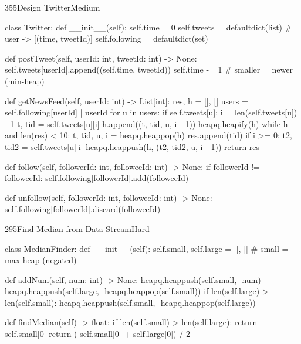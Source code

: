 \begin{problem}{355}{Design Twitter}{Medium}
\begin{code}
class Twitter:
    def __init__(self):
        self.time = 0
        self.tweets = defaultdict(list)    # user -> [(time, tweetId)]
        self.following = defaultdict(set)

    def postTweet(self, userId: int, tweetId: int) -> None:
        self.tweets[userId].append((self.time, tweetId))
        self.time -= 1                     # smaller = newer (min-heap)

    def getNewsFeed(self, userId: int) -> List[int]:
        res, h = [], []
        users = self.following[userId] | {userId}
        for u in users:
            if self.tweets[u]:
                i = len(self.tweets[u]) - 1
                t, tid = self.tweets[u][i]
                h.append((t, tid, u, i - 1))
        heapq.heapify(h)
        while h and len(res) < 10:
            t, tid, u, i = heapq.heappop(h)
            res.append(tid)
            if i >= 0:
                t2, tid2 = self.tweets[u][i]
                heapq.heappush(h, (t2, tid2, u, i - 1))
        return res

    def follow(self, followerId: int, followeeId: int) -> None:
        if followerId != followeeId:
            self.following[followerId].add(followeeId)

    def unfollow(self, followerId: int, followeeId: int) -> None:
        self.following[followerId].discard(followeeId)
\end{code}
\end{problem}

\begin{problem}{295}{Find Median from Data Stream}{Hard}
\begin{code}
class MedianFinder:
    def __init__(self):
        self.small, self.large = [], []    # small = max-heap (negated)

    def addNum(self, num: int) -> None:
        heapq.heappush(self.small, -num)
        heapq.heappush(self.large, -heapq.heappop(self.small))
        if len(self.large) > len(self.small):
            heapq.heappush(self.small, -heapq.heappop(self.large))

    def findMedian(self) -> float:
        if len(self.small) > len(self.large):
            return -self.small[0]
        return (-self.small[0] + self.large[0]) / 2
\end{code}
\end{problem}
